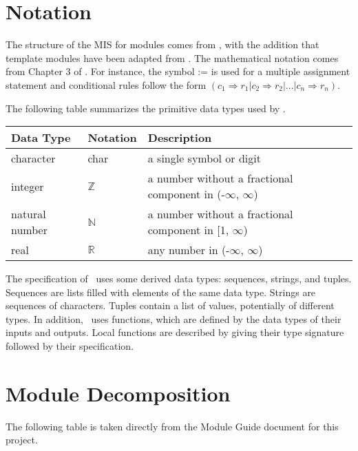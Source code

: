 \documentclass[12pt, titlepage]{article}
\begin{document}
\section{Notation}


The structure of the MIS for modules comes from \citet{HoffmanAndStrooper1995},
with the addition that template modules have been adapted from
\cite{GhezziEtAl2003}.  The mathematical notation comes from Chapter 3 of
\citet{HoffmanAndStrooper1995}.  For instance, the symbol := is used for a
multiple assignment statement and conditional rules follow the form $(c_1
\Rightarrow r_1 | c_2 \Rightarrow r_2 | ... | c_n \Rightarrow r_n )$.

The following table summarizes the primitive data types used by \progname. 

\begin{center}
\renewcommand{\arraystretch}{1.2}
\noindent 
\begin{tabular}{l l p{7.5cm}} 
\toprule 
\textbf{Data Type} & \textbf{Notation} & \textbf{Description}\\ 
\midrule
character & char & a single symbol or digit\\
integer & $\mathbb{Z}$ & a number without a fractional component in (-$\infty$, $\infty$) \\
natural number & $\mathbb{N}$ & a number without a fractional component in [1, $\infty$) \\
real & $\mathbb{R}$ & any number in (-$\infty$, $\infty$)\\
\bottomrule
\end{tabular} 
\end{center}

\noindent
The specification of \progname \ uses some derived data types: sequences, strings, and
tuples. Sequences are lists filled with elements of the same data type. Strings
are sequences of characters. Tuples contain a list of values, potentially of
different types. In addition, \progname \ uses functions, which
are defined by the data types of their inputs and outputs. Local functions are
described by giving their type signature followed by their specification.

\section{Module Decomposition}

The following table is taken directly from the Module Guide document for this project.
\end{document}
